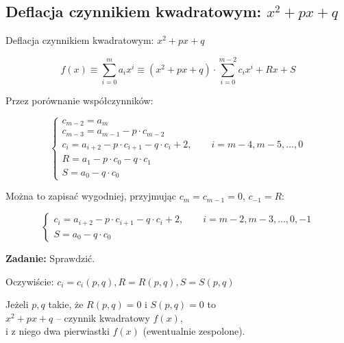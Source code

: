 \subsection{Deflacja czynnikiem kwadratowym: $ x^2 +px + q $}

\begin{frame}{Deflacja czynnikiem kwadratowym: $ x^2 +px + q $}
  \begin{block}{}
    $$ f(x) \equiv \sum_{i=0}^m a_i x^i \equiv (x^2 + px + q) \cdot \sum_{i=0}^{m-2} c_i x^i + Rx +S $$
  \end{block}

  \vspace{6mm}

  Przez porównanie współczynników:

  $$ \left \{ \begin{array}{l}
  c_{m-2} = a_m \\
  c_{m-3} = a_{m-1} - p \cdot c_{m-2} \\
  c_i = a_{i+2} - p \cdot c_{i+1} - q \cdot c_i + 2, \qquad i = m - 4, m - 5, \dots , 0 \\ %
  R = a_1 - p \cdot c_0 - q \cdot c_1 \\
  S = a_0 - q \cdot c_0
  \end{array} \right. $$
\end{frame}

\begin{frame}
  Można to zapisać wygodniej, przyjmując $ c_m = c_{m-1} = 0 $, $ c_{-1} = R $:

  \begin{block}{}
    $$ \left \{ \begin{array}{l}
    c_i = a_{i+2} - p \cdot c_{i+1} - q \cdot c_i + 2, \qquad i = m-2, m-3, \dots , 0, -1 \\
    S = a_0 - q \cdot c_0
    \end{array} \right. $$
  \end{block}

  \textbf{Zadanie:} Sprawdzić.

  \vspace{5px}

  Oczywiście: $ c_i = c_i(p,q), R = R(p,q), S = S(p,q) $

  \vspace{5px}

  Jeżeli $p,q$ takie, że $R(p,q) = 0$ i $S(p,q) = 0$ to \\ $x^2 + px + q$ -- czynnik kwadratowy $f(x)$, \\i z niego dwa pierwiastki $f(x)$ (ewentualnie zespolone).
\end{frame}
